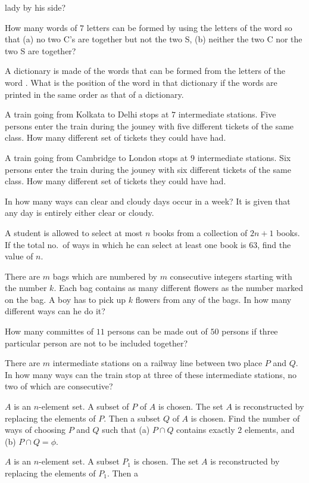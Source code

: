   lady by his side?
\item How many words of $7$ letters can be formed by using the letters of the word  so that (a) no two C's are together
  but not the two S, (b) neither the two C nor the two S are together?
\item A dictionary is made of the words that can be formed from the letters of the word . What is the position of the
  word  in that dictionary if the words are printed in the same order as that of a dictionary.
\item A train going from Kolkata to Delhi stops at $7$ intermediate stations. Five persons enter the train during the jouney with
  five different tickets of the same class. How many different set of tickets they could have had.
\item A train going from Cambridge to London stops at $9$ intermediate stations. Six persons enter the train during the jouney with
  six different tickets of the same class. How many different set of tickets they could have had.
\item In how many ways can clear and cloudy days occur in a week? It is given that any day is entirely either clear or cloudy.
\item A student is allowed to select at most $n$ books from a collection of $2n + 1$ books. If the total no.\ of ways in which he
  can select at least one book is $63$, find the value of $n$.
\item There are $m$ bags which are numbered by $m$ consecutive integers starting with the number $k$. Each bag contains as many
  different flowers as the  number marked on the bag. A boy has to pick up $k$ flowers from any of the bags. In how many different
  ways can he do it?
\item How many committes of $11$ persons can be made out of $50$ persons if three particular person are not to be included
  together?
\item There are $m$ intermediate stations on a railway line between two place $P$ and $Q$. In how many ways can the train stop at
  three of these intermediate stations, no two of which are consecutive?
\item $A$ is an $n$-element set. A subset of $P$ of $A$ is chosen. The set $A$ is reconstructed by replacing the elements of
  $P$. Then a subset $Q$ of $A$ is chosen. Find the number of ways of choosing $P$ and $Q$ such that (a) $P\cap Q$ contains
  exactly $2$ elements, and (b) $P\cap Q = \phi$.
\item $A$ is an $n$-element set. A subset $P_1$ is chosen. The set $A$ is reconstructed by replacing the elements of $P_1$. Then a
